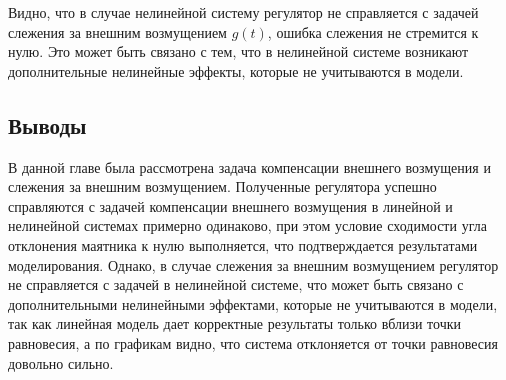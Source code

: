 Видно, что в случае нелинейной систему регулятор не справляется с задачей слежения за внешним возмущением $g(t)$, 
ошибка слежения не стремится к нулю. Это может быть связано с тем, что в нелинейной системе возникают дополнительные нелинейные эффекты, которые не учитываются в модели.

\subsection{Выводы}
В данной главе была рассмотрена задача компенсации внешнего возмущения и слежения за внешним возмущением. 
Полученные регулятора успешно справляются с задачей компенсации внешнего возмущения в линейной и нелинейной системах 
примерно одинаково, при этом условие сходимости угла отклонения маятника к нулю выполняется, что подтверждается результатами моделирования.
Однако, в случае слежения за внешним возмущением регулятор не справляется с задачей в нелинейной системе, что может быть связано с дополнительными нелинейными эффектами, которые не учитываются в модели, 
так как линейная модель дает корректные результаты только вблизи точки равновесия, а по графикам видно, что система отклоняется от точки равновесия довольно сильно. 